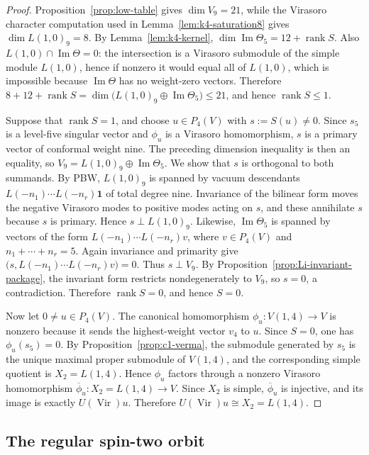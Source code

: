 \documentclass[12pt,leqno]{amsart}
\numberwithin{equation}{section} \newtheorem{thm}{Theorem}[section] \newtheorem{lem}[thm]{Lemma} \newtheorem{ex}[thm]{Example} \newtheorem{prop}[thm]{Proposition} \newtheorem{cor}[thm]{Corollary} \newtheorem{defi}[thm]{Definition} \newtheorem{rmk}[thm]{Remark} \newtheorem{notation}[thm]{Notation}
\newcommand{\one}{\mathbf{1}}
\newcommand{\Vir}{\operatorname{Vir}}
\begin{document}
\begin{proof}
Proposition~\ref{prop:low-table} gives $\dim V_9=21$, while the Virasoro character computation used in Lemma~\ref{lem:k4-saturation8} gives $\dim L(1,0)_9=8$. By Lemma~\ref{lem:k4-kernel}, \(\dim\operatorname{Im}\Theta_5=12+\operatorname{rank}S\). Also \(L(1,0)\cap\operatorname{Im}\Theta=0\): the intersection is a Virasoro submodule of the simple module $L(1,0)$, hence if nonzero it would equal all of $L(1,0)$, which is impossible because $\operatorname{Im}\Theta$ has no weight-zero vectors. Therefore \(8+12+\operatorname{rank}S =\dim\bigl(L(1,0)_9\oplus\operatorname{Im}\Theta_5\bigr) \le21\), and hence $\operatorname{rank}S\le1$.

Suppose that $\operatorname{rank}S=1$, and choose $u\in P_4(V)$ with $s:=S(u)\ne0$. Since $s_5$ is a level-five singular vector and $\phi_u$ is a Virasoro homomorphism, $s$ is a primary vector of conformal weight nine. The preceding dimension inequality is then an equality, so \(V_9=L(1,0)_9\oplus\operatorname{Im}\Theta_5.\) We show that $s$ is orthogonal to both summands. By PBW, $L(1,0)_9$ is spanned by vacuum descendants \(L(-n_1)\cdots L(-n_r)\one\) of total degree nine. Invariance of the bilinear form moves the negative Virasoro modes to positive modes acting on $s$, and these annihilate $s$ because $s$ is primary. Hence \(s\perp L(1,0)_9\). Likewise, $\operatorname{Im}\Theta_5$ is spanned by vectors of the form \(L(-n_1)\cdots L(-n_r)v\), where $v\in P_4(V)$ and $n_1+\cdots+n_r=5$. Again invariance and primarity give \(\bigl(s,L(-n_1)\cdots L(-n_r)v\bigr)=0.\) Thus $s\perp V_9$. By Proposition~\ref{prop:Li-invariant-package}, the invariant form restricts nondegenerately to $V_9$, so $s=0$, a contradiction. Therefore $\operatorname{rank}S=0$, and hence $S=0$.

Now let $0\ne u\in P_4(V)$. The canonical homomorphism \(\phi_u:V(1,4)\to V\) is nonzero because it sends the highest-weight vector $v_4$ to $u$. Since $S=0$, one has $\phi_u(s_5)=0$. By Proposition~\ref{prop:c1-verma}, the submodule generated by $s_5$ is the unique maximal proper submodule of $V(1,4)$, and the corresponding simple quotient is $X_2=L(1,4)$. Hence $\phi_u$ factors through a nonzero Virasoro homomorphism \(\overline\phi_u:X_2=L(1,4)\longrightarrow V.\) Since $X_2$ is simple, $\overline\phi_u$ is injective, and its image is exactly $U(\Vir)u$. Therefore \(U(\Vir)u\cong X_2=L(1,4)\).
\end{proof}

\subsection{The regular spin-two orbit}
\end{document}
